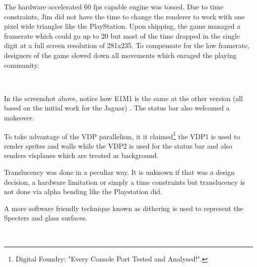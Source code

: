 \par
The hardware accelerated 60 fps capable engine was tossed. Due to time constraints, Jim did not have the time to change the renderer to work with one pixel wide triangles like the PlayStation. Upon shipping, the game managed a framerate which could go up to 20 but most of the time dropped in the single digit at a full screen resolution of 281x235. To compensate for the low framerate, designers of the game slowed down all movements which enraged the playing community.\\
\par
{}







\\
\par
In the screenshot above, notice how E1M1 is the same at the other version (all based on the initial work for the Jaguar) . The status bar also welcomed a makeover.\\
\par
To take advantage of the VDP parallelism, it it claimed\footnote{Digital Foundry: "Every Console Port Tested and Analysed!".} the VDP1 is used to render sprites and walls while the VDP2 is used for the status bar and also renders visplanes which are treated as background.\\
\par 
Translucency was done in a peculiar way. It is unknown if that was a design decision, a hardware limitation or simply a time constraints but translucency is not done via alpha bending like the Playstation did.\\
\par
 A more software friendly technique known as dithering is used to represent the Specters and glass surfaces.







\\



